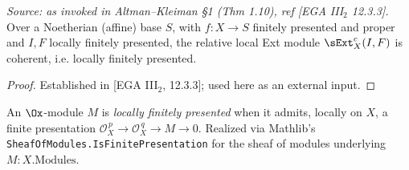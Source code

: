 \begin{theorem}
  \label{thm:ega_ext_coherent_fp}
  \textit{Source: as invoked in Altman--Kleiman §1 (Thm 1.10), ref [EGA III$_2$ 12.3.3].}
  Over a Noetherian (affine) base $S$, with $f : X \to S$ finitely presented and
  proper and $I, F$ locally finitely presented, the relative local Ext module
  $\sExt^c_X(I, F)$ is coherent, i.e. locally finitely presented.
  \begin{proof}
    Established in [EGA III$_2$, 12.3.3]; used here as an external input.
  \end{proof}
\end{theorem}



\begin{definition}

\leanok
{}
  \label{def:isLFP}
  An $\Ox$-module $M$ is \emph{locally finitely presented} when it admits, locally
  on $X$, a finite presentation $\mathcal{O}_X^{\,p} \to \mathcal{O}_X^{\,q} \to M
  \to 0$. Realized via Mathlib's \texttt{SheafOfModules.IsFinitePresentation} for
  the sheaf of modules underlying $M : X.\mathrm{Modules}$.
\end{definition}

